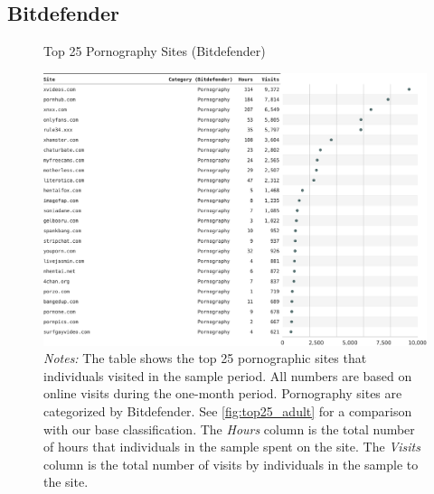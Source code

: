 \documentclass[12pt, letterpaper]{article}
\begin{document}
\subsection{Bitdefender}
\begin{figure}[ht]
	\centering
	\caption{Top 25 Pornography Sites (Bitdefender)}
	\includegraphics[width=\textwidth]{figs/top_25_adultsites_bitdefender.pdf}
	\caption*{\footnotesize \emph{Notes:} 
		The table shows the top 25 pornographic sites that individuals visited in the sample period.
            All numbers are based on online visits during the one-month period.
		Pornography sites are categorized by Bitdefender.
            See \cref{fig:top25_adult} for a comparison with our base classification.
    	The \emph{Hours} column is the total number of hours that individuals in the sample spent on the site. 
    	The \emph{Visits} column is the total number of visits by individuals in the sample to the site.            
	}
	\label{fig:top25_adult_bitdefender}
\end{figure}





\end{document}
